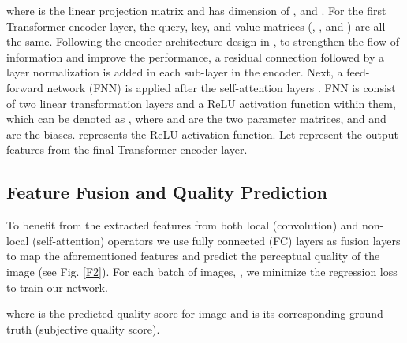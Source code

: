 \documentclass[10pt,twocolumn,letterpaper]{article}
\begin{document}
where  is   the linear projection matrix and has dimension of ,  and  .
For the first Transformer encoder layer, the query, key, and value matrices (, , and ) are all the same.
Following the encoder architecture design in \cite{vaswani2017attention}, to strengthen the flow of information and improve the performance,  a residual connection followed by a layer normalization is added in each sub-layer in the encoder.
Next, a feed-forward network (FNN) is
applied after the self-attention layers \cite{vaswani2017attention}. 
FNN is consist of two
linear transformation layers and a ReLU activation function
within them, which can be denoted as  ,
where  and  are the two parameter matrices, and  and  are the biases.  represents the ReLU activation function.
Let  represent the output features from the final Transformer encoder layer.




\subsection{Feature Fusion and Quality Prediction}
\label{S3.3}
To benefit from the extracted features from both local (convolution) and non-local (self-attention) operators 
we use fully connected (FC) layers  as  fusion layers to map the aforementioned features and predict the perceptual quality of the image (see Fig. \ref{F2}).
For each batch of images, , we minimize the  regression loss to train our network.

where  is the predicted quality score for  image and  is its corresponding ground truth (subjective  quality score).
 
\end{document}
